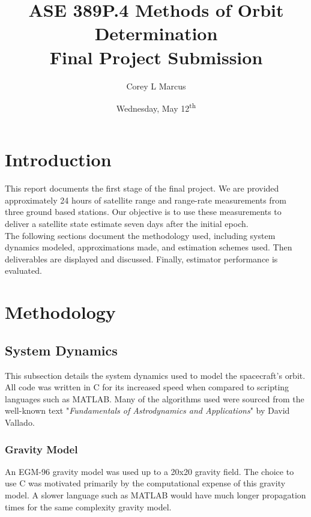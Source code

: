 \documentclass[11pt]{article}
\title{ASE 389P.4 Methods of Orbit Determination \\ Final Project Submission}
\author{Corey L Marcus} \date{Wednesday, May 12\textsuperscript{th}}
\def\CC{{C\nolinebreak[4]\hspace{-.05em}\raisebox{.4ex}{\tiny\bf ++}}}
\begin{document}
\onehalfspace
\maketitle


\section{Introduction}

This report documents the first stage of the final project. We are provided approximately 24 hours of satellite range and range-rate measurements from three ground based stations. Our objective is to use these measurements to deliver a satellite state estimate seven days after the initial epoch. \\

The following sections document the methodology used, including system dynamics modeled, approximations made, and estimation schemes used. Then deliverables are displayed and discussed. Finally, estimator performance is evaluated.

\section{Methodology}

\subsection{System Dynamics}

This subsection details the system dynamics used to model the spacecraft's orbit. All code was written in {\CC} for its increased speed when compared to scripting languages such as MATLAB. Many of the algorithms used were sourced from the well-known text "\textit{Fundamentals of Astrodynamics and Applications}" by David Vallado.

\subsubsection{Gravity Model}

An EGM-96 gravity model was used up to a 20x20 gravity field. The choice to use {\CC} was motivated primarily by the computational expense of this gravity model. A slower language such as MATLAB would have much longer propagation times for the same complexity gravity model.
\end{document}

